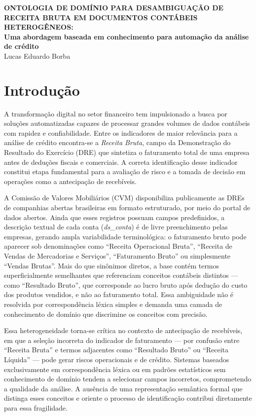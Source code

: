\documentclass[12pt,a4paper]{article}
\begin{document}
\begin{center}
\textbf{ONTOLOGIA DE DOMÍNIO PARA DESAMBIGUAÇÃO DE RECEITA BRUTA EM DOCUMENTOS CONTÁBEIS HETEROGÊNEOS:}\\
\textbf{Uma abordagem baseada em conhecimento para automação da análise de crédito}\\
\vspace{0.5\baselineskip}
Lucas Eduardo Borba
\end{center}

\section{Introdução}

A transformação digital no setor financeiro tem impulsionado a busca por soluções automatizadas capazes de processar grandes volumes de dados contábeis com rapidez e confiabilidade. Entre os indicadores de maior relevância para a análise de crédito encontra-se a \textit{Receita Bruta}, campo da Demonstração do Resultado do Exercício (DRE) que sintetiza o faturamento total de uma empresa antes de deduções fiscais e comerciais. A correta identificação desse indicador constitui etapa fundamental para a avaliação de risco e a tomada de decisão em operações como a antecipação de recebíveis.

A Comissão de Valores Mobiliários (CVM) disponibiliza publicamente as DREs de companhias abertas brasileiras em formato estruturado, por meio do portal de dados abertos. Ainda que esses registros possuam campos predefinidos, a descrição textual de cada conta (\textit{ds\_conta}) é de livre preenchimento pelas empresas, gerando ampla variabilidade terminológica: o faturamento bruto pode aparecer sob denominações como ``Receita Operacional Bruta'', ``Receita de Vendas de Mercadorias e Serviços'', ``Faturamento Bruto'' ou simplesmente ``Vendas Brutas''. Mais do que sinônimos diretos, a base contém termos superficialmente semelhantes que referenciam conceitos contábeis distintos --- como ``Resultado Bruto'', que corresponde ao lucro bruto após dedução do custo dos produtos vendidos, e não ao faturamento total. Essa ambiguidade não é resolvida por correspondência léxica simples e demanda uma camada de conhecimento de domínio que discrimine os conceitos com precisão.

Essa heterogeneidade torna-se crítica no contexto de antecipação de recebíveis, em que a seleção incorreta do indicador de faturamento --- por confusão entre ``Receita Bruta'' e termos adjacentes como ``Resultado Bruto'' ou ``Receita Líquida'' --- pode gerar riscos operacionais e de crédito. Sistemas baseados exclusivamente em correspondência léxica ou em padrões estatísticos sem conhecimento de domínio tendem a selecionar campos incorretos, comprometendo a qualidade da análise. A ausência de uma representação semântica formal que distinga esses conceitos e oriente o processo de identificação contribui diretamente para essa fragilidade.
\end{document}
